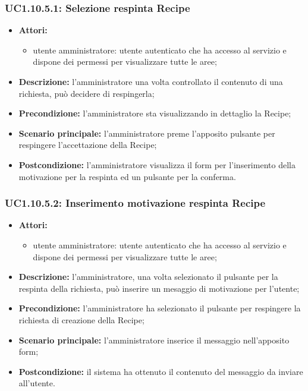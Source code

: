 \subsubsection{UC1.10.5.1: Selezione respinta Recipe}
\begin{itemize}
	\item \textbf{Attori:}
	\begin{itemize}
		\item utente amministratore: utente autenticato che ha accesso al servizio e dispone dei permessi per visualizzare tutte le aree;
	\end{itemize}
	\item \textbf{Descrizione:} l'amministratore una volta controllato il contenuto di una richiesta, può decidere di respingerla;
	\item \textbf{Precondizione:} l'amministratore sta visualizzando in dettaglio la Recipe;
	\item \textbf{Scenario principale:} l'amministratore preme l'apposito pulsante per respingere l'accettazione della Recipe;
	\item \textbf{Postcondizione:} l'amministratore visualizza il form per l'inserimento della motivazione per la respinta ed un pulsante per la conferma.
\end{itemize}

\subsubsection{UC1.10.5.2: Inserimento motivazione respinta Recipe}
\begin{itemize}
	\item \textbf{Attori:}
	\begin{itemize}
		\item utente amministratore: utente autenticato che ha accesso al servizio e dispone dei permessi per visualizzare tutte le aree;
	\end{itemize}
	\item \textbf{Descrizione:} l'amministratore, una volta selezionato il pulsante per la respinta della richiesta, può inserire un mesaggio di motivazione per l'utente;
	\item \textbf{Precondizione:} l'amministratore ha selezionato il pulsante per respingere la richiesta di creazione della Recipe;
	\item \textbf{Scenario principale:} l'amministratore inserice il messaggio nell'apposito form;
	\item \textbf{Postcondizione:} il sistema ha ottenuto il contenuto del messaggio da inviare all'utente.
\end{itemize}

